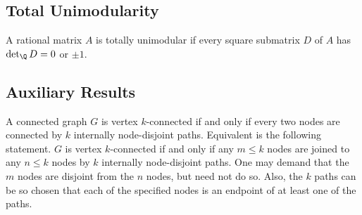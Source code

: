 \begin{definition}[$2$-sum]
  \label{def:2_sum}
\end{definition}

\begin{definition}[$3$-sum]
  \label{def:3_sum}
\end{definition}

\begin{definition}
  \label{def:Delta_sum}
\end{definition}

\begin{definition}[$Y$-sum]
  \label{def:Y_sum}
\end{definition}


\subsection{Total Unimodularity}

\begin{definition}[TU matrix]
  \label{def:tu_matrix}
  A rational matrix $A$ is totally unimodular if every square submatrix $D$ of $A$ has $\det_{\Q} D = 0$ or $\pm 1$.
\end{definition}



\subsection{Auxiliary Results}

\begin{theorem}
  \label{thm:Menger}
  A connected graph $G$ is vertex $k$-connected if and only if every two nodes are connected by $k$ internally node-disjoint paths.
  Equivalent is the following statement. $G$ is vertex $k$-connected if and only if any $m \leq k$ nodes are joined to any $n \leq k$ nodes by $k$ internally node-disjoint paths.
  One may demand that the $m$ nodes are disjoint from the $n$ nodes, but need not do so.
  Also, the $k$ paths can be so chosen that each of the specified nodes is an endpoint of at least one of the paths.
\end{theorem}

\begin{definition}
  \label{def:Delta_Y_exchange}
\end{definition}

\begin{definition}[gap]
  \label{def:gap}
\end{definition}

